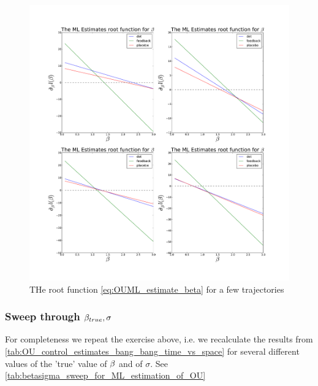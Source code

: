 \begin{figure}[htp]
\begin{center}
  \includegraphics[width=1\textwidth]{Figs/OU_MIControlSimulator/BetaRoot_Tf=16.pdf}
  \caption[labelInTOC]{THe root function \cref{eq:OUML_estimate_beta} for a few
  trajectories}
  \label{fig:ML_beta_root}
\end{center}
\end{figure}



\subsubsection{Sweep through $\beta_{true}, \sigma $}

For completeness we repeat the exercise above, i.e. we recalculate the results
from \cref{tab:OU_control_estimates_bang_bang_time_vs_space} for several
different values of the 'true' value of $\beta$ and of $\sigma$. See
\cref{tab:betasigma_sweep_for_ML_estimation_of_OU}

